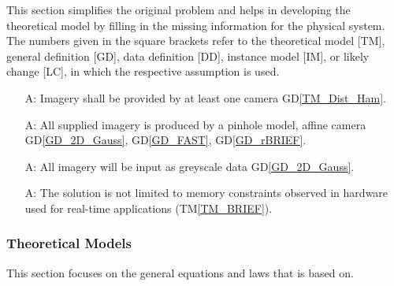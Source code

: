 \documentclass[12pt]{article}
\newcommand{\dref}[1]{GD\ref{#1}}
\newcommand{\tref}[1]{TM\ref{#1}}
\newcounter{assumpnum} %
\begin{document}
This section simplifies the original problem and helps in developing the
theoretical model by filling in the missing information for the physical system.
The numbers given in the square brackets refer to the theoretical model [TM],
general definition [GD], data definition [DD], instance model [IM], or likely
change [LC], in which the respective assumption is used.

\begin{itemize}
\item[A\refstepcounter{assumpnum}\theassumpnum \label{A:min_num_cameras}:]
Imagery shall be provided by at least one camera \dref{TM_Dist_Ham}.

\item[A\refstepcounter{assumpnum}\theassumpnum \label{A:camera_model}:]
All supplied imagery is produced by a pinhole model, affine camera 
\dref{GD_2D_Gauss}, \dref{GD_FAST}, \dref{GD_rBRIEF}.

\item[A\refstepcounter{assumpnum}\theassumpnum \label{A:greyscale}:]
All imagery will be input as greyscale data \dref{GD_2D_Gauss}.

\item[A\refstepcounter{assumpnum}\theassumpnum \label{A:RT_Memory}:]
The solution is not limited to memory constraints observed in hardware used for real-time 
applications (\tref{TM_BRIEF}).

\end{itemize}

\subsubsection{Theoretical Models}\label{sec_theoretical}



This section focuses on the general equations and laws that \progname{} is based
on.  
\end{document}
